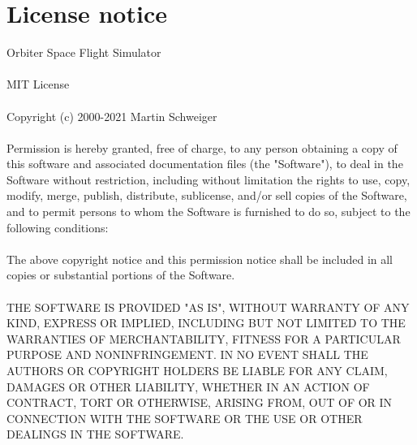 \documentclass[Orbiter User Manual.tex]{subfiles}
\begin{document}
\section{License notice}
Orbiter Space Flight Simulator\\
\\
MIT License\\
\\
Copyright (c) 2000-2021 Martin Schweiger\\
\\
Permission is hereby granted, free of charge, to any person obtaining a copy of this software and associated documentation files (the "Software"), to deal in the Software without restriction, including without limitation the rights to use, copy, modify, merge, publish, distribute, sublicense, and/or sell copies of the Software, and to permit persons to whom the Software is furnished to do so, subject to the following conditions:\\
\\
The above copyright notice and this permission notice shall be included in all copies or substantial portions of the Software.\\
\\
THE SOFTWARE IS PROVIDED "AS IS", WITHOUT WARRANTY OF ANY KIND, EXPRESS OR IMPLIED, INCLUDING BUT NOT LIMITED TO THE WARRANTIES OF MERCHANTABILITY, FITNESS FOR A PARTICULAR PURPOSE AND NONINFRINGEMENT. IN NO EVENT SHALL THE AUTHORS OR COPYRIGHT HOLDERS BE LIABLE FOR ANY CLAIM, DAMAGES OR OTHER LIABILITY, WHETHER IN AN ACTION OF CONTRACT, TORT OR OTHERWISE, ARISING FROM, OUT OF OR IN CONNECTION WITH THE SOFTWARE OR THE USE OR OTHER DEALINGS IN THE SOFTWARE.
\end{document}
